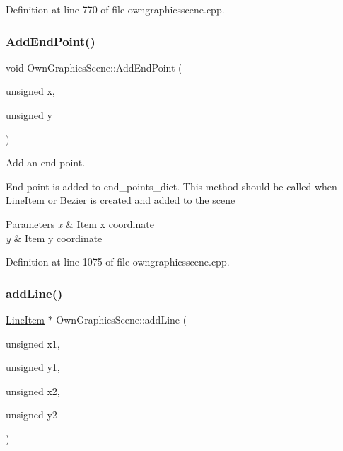 Definition at line 770 of file owngraphicsscene.\+cpp.

\mbox{\label{classOwnGraphicsScene_a64ce3afc4e535576fedbfe3f172cea0d}} 
\subsubsection{\texorpdfstring{Add\+End\+Point()}{AddEndPoint()}}
{\footnotesize\ttfamily void Own\+Graphics\+Scene\+::\+Add\+End\+Point (\begin{DoxyParamCaption}\item[{unsigned}]{x,  }\item[{unsigned}]{y }\end{DoxyParamCaption})}



Add an end point. 

End point is added to end\+\_\+points\+\_\+dict. This method should be called when \mbox{\hyperlink{classLineItem}{Line\+Item}} or \mbox{\hyperlink{classBezier}{Bezier}} is created and added to the scene 
\begin{DoxyParams}{Parameters}
{\em x} & Item x coordinate \\
\hline
{\em y} & Item y coordinate \\
\hline
\end{DoxyParams}


Definition at line 1075 of file owngraphicsscene.\+cpp.

\mbox{\label{classOwnGraphicsScene_a4251b836ee575083f4eeaa73254723f4}} 
\subsubsection{\texorpdfstring{add\+Line()}{addLine()}}
{\footnotesize\ttfamily \mbox{\hyperlink{classLineItem}{Line\+Item}} $\ast$ Own\+Graphics\+Scene\+::add\+Line (\begin{DoxyParamCaption}\item[{unsigned}]{x1,  }\item[{unsigned}]{y1,  }\item[{unsigned}]{x2,  }\item[{unsigned}]{y2 }\end{DoxyParamCaption})}



